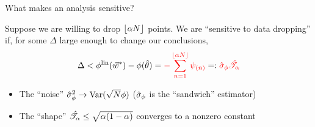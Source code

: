 





\begin{frame}{What makes an analysis sensitive?}

Suppose we are willing to drop $\lfloor \alpha N \rfloor$ points.
%
We are ``sensitive to data dropping'' if, for some $\Delta$ large enough to
change our conclusions,
%
\begin{align*}
%
\Delta < \thetafunlin(\w^*) - \thetafun(\thetahat)  =
    {\color{red}- \sum_{n=1}^{\lfloor \alpha N \rfloor} \infl_{(n)} }
    =:  {\color{red} \noise } { \color{red} \shape}
%
\end{align*}
%

\begin{itemize}
\item The ``noise'' $\hat\sigma_{\phi}^2 \rightarrow \mathrm{Var}(\sqrt{N}\phi)$
    ($\hat\sigma_{\phi}$ is the ``sandwich'' estimator)
\item The ``shape'' $\hat{\mathscr{T}}_\alpha \le \sqrt{\alpha (1 - \alpha)}$
    converges to a nonzero constant
\end{itemize}

\begin{center}
\begin{minipage}{0.8\textwidth}
\end{minipage}
\end{center}




\end{frame}



